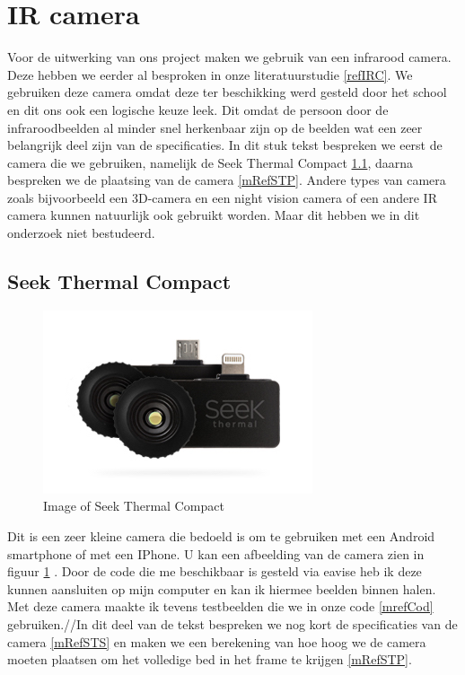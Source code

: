\section{IR camera}
\label{MRefIRC}
Voor de uitwerking van ons project maken we gebruik van een infrarood camera. Deze hebben we eerder al besproken in onze literatuurstudie \ref{refIRC}. We gebruiken deze camera omdat deze ter beschikking werd gesteld door het school en dit ons ook een logische keuze leek. Dit omdat de persoon door de infraroodbeelden al minder snel herkenbaar zijn op de beelden wat een zeer belangrijk deel zijn van de specificaties. In dit stuk tekst bespreken we eerst de camera die we gebruiken, namelijk de Seek Thermal Compact \ref{mRefSTh}, daarna bespreken we de plaatsing van de camera \ref{mRefSTP}. Andere types van camera zoals bijvoorbeeld een 3D-camera en een night vision camera of een andere IR camera kunnen natuurlijk ook gebruikt worden. Maar dit hebben we in dit onderzoek niet bestudeerd.

\subsection{Seek Thermal Compact}
\label{mRefSTh}

\begin{figure}[hbp]
	\includegraphics[scale=0.75]{SeekThermalCompac}
	\caption{Image of Seek Thermal Compact}
	\label{imgSTC}
\end{figure}
Dit is een zeer kleine camera die bedoeld is om te gebruiken met een Android smartphone of met een IPhone. U kan een afbeelding van de camera zien in figuur \ref{imgSTC} \cite{bibImgSTC}. Door de code die me beschikbaar is gesteld via eavise \cite{bibSTC} heb ik deze kunnen aansluiten op mijn computer en kan ik hiermee beelden binnen halen. Met deze camera maakte ik tevens testbeelden die we in onze code \ref{mrefCod} gebruiken.//In dit deel van de tekst bespreken we nog kort de specificaties van de camera \ref{mRefSTS} en maken we een berekening van hoe hoog we de camera moeten plaatsen om het volledige bed in het frame te krijgen \ref{mRefSTP}.

